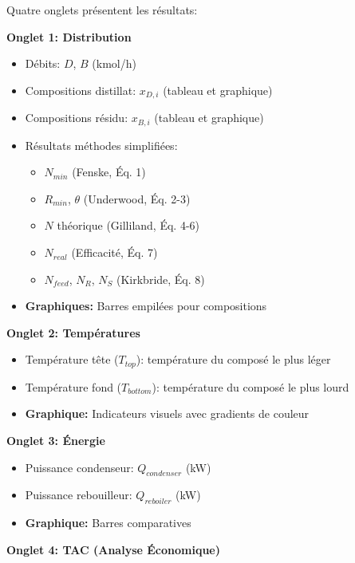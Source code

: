 \documentclass[11pt,a4paper]{article}
\begin{document}
Quatre onglets présentent les résultats:

\textbf{Onglet 1: Distribution}

\begin{itemize}[leftmargin=*]
    \item Débits: $D$, $B$ (kmol/h)
    \item Compositions distillat: $x_{D,i}$ (tableau et graphique)
    \item Compositions résidu: $x_{B,i}$ (tableau et graphique)
    \item Résultats méthodes simplifiées:
    \begin{itemize}
        \item $N_{min}$ (Fenske, Éq. 1)
        \item $R_{min}$, $\theta$ (Underwood, Éq. 2-3)
        \item $N$ théorique (Gilliland, Éq. 4-6)
        \item $N_{real}$ (Efficacité, Éq. 7)
        \item $N_{feed}$, $N_R$, $N_S$ (Kirkbride, Éq. 8)
    \end{itemize}
    \item \textbf{Graphiques:} Barres empilées pour compositions
\end{itemize}

\textbf{Onglet 2: Températures}

\begin{itemize}[leftmargin=*]
    \item Température tête ($T_{top}$): température du composé le plus léger
    \item Température fond ($T_{bottom}$): température du composé le plus lourd
    \item \textbf{Graphique:} Indicateurs visuels avec gradients de couleur
\end{itemize}

\textbf{Onglet 3: Énergie}

\begin{itemize}[leftmargin=*]
    \item Puissance condenseur: $Q_{condenser}$ (kW)
    \item Puissance rebouilleur: $Q_{reboiler}$ (kW)
    \item \textbf{Graphique:} Barres comparatives
\end{itemize}

\textbf{Onglet 4: TAC (Analyse Économique)}
\end{document}
